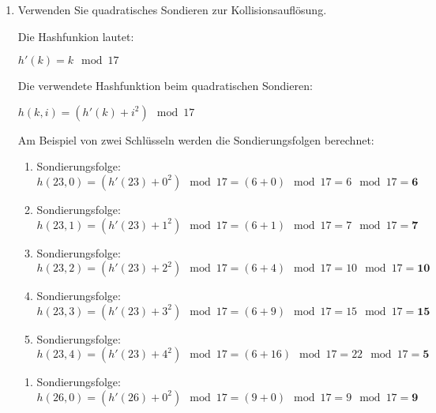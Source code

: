 \documentclass{lehramt-informatik}
\begin{document}
\begin{enumerate}
\begin{enumerate}

\item Verwenden Sie quadratisches Sondieren zur Kollisionsauflösung.

\begin{antwort}

\def\tmp#1{{\footnotesize#1}}

Die Hashfunkion lautet:

\tmp{$h'(k) = k \mod 17$}

Die verwendete Hashfunktion beim quadratischen Sondieren:

\tmp{$h(k, i) = (h'(k) + i^2) \mod 17$}

\bigskip

Am Beispiel von zwei Schlüsseln werden die Sondierungsfolgen berechnet:

\bigskip


\begin{enumerate}
\item Sondierungsfolge: \\
\tmp{$h(23, 0) = (h'(23) + 0^2) \mod 17 = (6 + 0) \mod 17 = 6 \mod 17 = \textbf{6}$}

\item Sondierungsfolge: \\
\tmp{$h(23, 1) = (h'(23) + 1^2) \mod 17 = (6 + 1) \mod 17 = 7 \mod 17 = \textbf{7}$}

\item Sondierungsfolge: \\
\tmp{$h(23, 2) = (h'(23) + 2^2) \mod 17 = (6 + 4) \mod 17 = 10 \mod 17 = \textbf{10}$}

\item Sondierungsfolge: \\
\tmp{$h(23, 3) = (h'(23) + 3^2) \mod 17 = (6 + 9) \mod 17 = 15 \mod 17 = \textbf{15}$}

\item Sondierungsfolge: \\
\tmp{$h(23, 4) = (h'(23) + 4^2) \mod 17 = (6 + 16) \mod 17 = 22 \mod 17 = \textbf{5}$}
\end{enumerate}

\bigskip


\begin{enumerate}
\item Sondierungsfolge: \\
\tmp{$h(26, 0) = (h'(26) + 0^2) \mod 17 = (9 + 0) \mod 17 = 9 \mod 17 = \textbf{9}$}


\end{enumerate}
\end{antwort}
\end{enumerate}
\end{enumerate}
\end{document}
